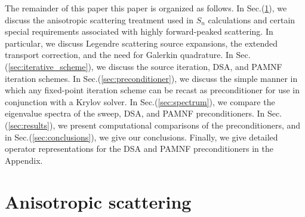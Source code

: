 \documentclass[preprint,10pt]{elsarticle}
\renewcommand{\(}{\left(}
\renewcommand{\)}{\right)}
\renewcommand{\[}{\left[}
\renewcommand{\]}{\right]}
\begin{document}
The remainder of this paper this paper is organized as follows. In
Sec.(\ref{sec:anisotropy}), we
discuss the anisotropic scattering treatment used in $S_n$ calculations and
certain special requirements associated with highly forward-peaked scattering.
In particular, we discuss Legendre scattering source expansions, the extended
transport correction, and the need for Galerkin quadrature. In
Sec.(\ref{sec:iterative_scheme}), we
discuss the source iteration, DSA, and PAMNF iteration schemes. In
Sec.(\ref{sec:preconditioner}), we
discuss the simple manner in which any fixed-point iteration scheme can be
recast as preconditioner for use in conjunction with a Krylov solver. In
Sec.(\ref{sec:spectrum}),
we compare the eigenvalue spectra of the sweep, DSA, and PAMNF
preconditioners. In Sec.(\ref{sec:results}), we present computational comparisons of the
preconditioners, and in Sec.(\ref{sec:conclusions}), we give our conclusions. Finally, we give
detailed operator representations for the DSA and PAMNF
preconditioners in the Appendix.

\section{Anisotropic scattering} \label{sec:anisotropy}
\end{document}
